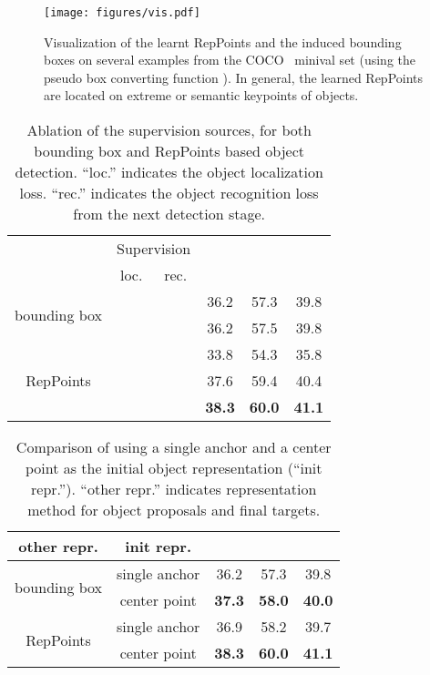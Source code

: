 \documentclass[10pt,twocolumn,letterpaper]{article}
\begin{document}
 \begin{figure*}[tb]
\centering
\texttt{[image: figures/vis.pdf]}
\caption{Visualization of the learnt RepPoints and the induced bounding boxes on several examples from the COCO~\cite{MSCOCO} minival set (using the pseudo box converting function ). In general, the learned RepPoints are located on extreme or semantic keypoints of objects.}
\label{fig::visualization}
\end{figure*}
 \begin{table}[tb]
	\begin{center}
	\begin{tabular}{c|c|c|c|c|c}
	\hline
	\multirow{2}{*}{\makecell{Representation}} & \multicolumn{2}{c|}{Supervision}  & \multirow{2}{*}{} & \multirow{2}{*}{} & \multirow{2}{*}{} \\
	\cline{2-3}
	& loc. & rec. & & & \\
	\hline
	\hline
	\multirow{2}{*}{bounding box} & \checkmark & & 36.2 & 57.3 & 39.8 \\
	\cline{2-6}
	 & \checkmark &\checkmark& 36.2 & 57.5 & 39.8 \\
	\hline
	\multirow{3}{*}{RepPoints} & & \checkmark & 33.8 & 54.3 & 35.8 \\
	\cline{2-6}
	 & \checkmark & & 37.6 & 59.4 & 40.4 \\
	\cline{2-6}
	 & \checkmark & \checkmark & \textbf{38.3} & \textbf{60.0} & \textbf{41.1} \\
	\hline
    \end{tabular}
	\end{center}
\caption{Ablation of the supervision sources, for both bounding box and RepPoints based object detection. ``loc.'' indicates the object localization loss. ``rec.'' indicates the object recognition loss from the next detection stage.}
\label{tab::reppoints_learning}
\end{table}
 \begin{table}[tb]
	\begin{center}
	\begin{tabular}{c|c|c|c|c}
	\hline
	other repr. & init repr. &  &  &  \\
	\hline
	\multirow{2}{*}{bounding box} & single anchor  & 36.2 & 57.3 & 39.8 \\
	\cline{2-5}
	& center point & \textbf{37.3} & \textbf{58.0} & \textbf{40.0} \\
	\hline
	\multirow{2}{*}{RepPoints} & single anchor & 36.9 & 58.2 & 39.7 \\
 	\cline{2-5}
    & center point & \textbf{38.3} & \textbf{60.0} & \textbf{41.1} \\ 
	\hline
	\end{tabular}
	\end{center}
\caption{Comparison of using a single anchor and a center point as the initial object representation (``init repr.''). ``other repr.'' indicates representation method for object proposals and final targets.}
\label{tab::loader}
\end{table}
\end{document}
